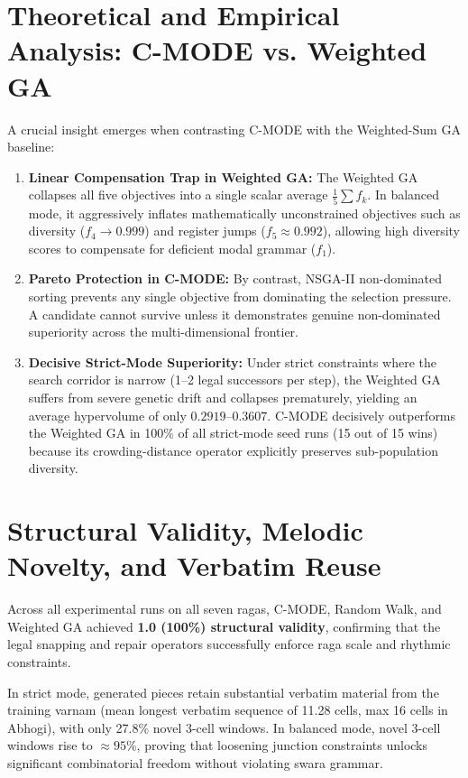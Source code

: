 \documentclass[12pt,a4paper]{report}
\begin{document}
\section{Theoretical and Empirical Analysis: C-MODE vs. Weighted GA}
A crucial insight emerges when contrasting C-MODE with the Weighted-Sum GA baseline:
\begin{enumerate}
    \item \textbf{Linear Compensation Trap in Weighted GA:} The Weighted GA collapses all five objectives into a single scalar average $\frac{1}{5}\sum f_k$. In balanced mode, it aggressively inflates mathematically unconstrained objectives such as diversity ($f_4 \rightarrow 0.999$) and register jumps ($f_5 \approx 0.992$), allowing high diversity scores to compensate for deficient modal grammar ($f_1$).
    \item \textbf{Pareto Protection in C-MODE:} By contrast, NSGA-II non-dominated sorting prevents any single objective from dominating the selection pressure. A candidate cannot survive unless it demonstrates genuine non-dominated superiority across the multi-dimensional frontier.
    \item \textbf{Decisive Strict-Mode Superiority:} Under strict constraints where the search corridor is narrow (1--2 legal successors per step), the Weighted GA suffers from severe genetic drift and collapses prematurely, yielding an average hypervolume of only $0.2919$--$0.3607$. C-MODE decisively outperforms the Weighted GA in 100\% of all strict-mode seed runs (15 out of 15 wins) because its crowding-distance operator explicitly preserves sub-population diversity.
\end{enumerate}

\section{Structural Validity, Melodic Novelty, and Verbatim Reuse}
Across all experimental runs on all seven ragas, C-MODE, Random Walk, and Weighted GA achieved \textbf{1.0 (100\%) structural validity}, confirming that the legal snapping and repair operators successfully enforce raga scale and rhythmic constraints.

In strict mode, generated pieces retain substantial verbatim material from the training varnam (mean longest verbatim sequence of 11.28 cells, max 16 cells in Abhogi), with only 27.8\% novel 3-cell windows. In balanced mode, novel 3-cell windows rise to $\approx 95\%$, proving that loosening junction constraints unlocks significant combinatorial freedom without violating swara grammar.
\end{document}
